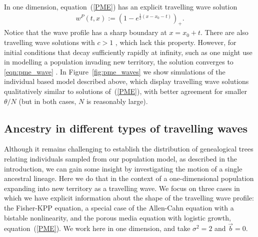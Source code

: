 \documentclass[EJP]{ejpecp} %
\newcommand{\meanq}{\vec b}    %
\newcommand{\comment}[1]{{\color{blue} \it #1}}
\newcommand{\citep}[1]{\cite{#1}}
\begin{document}
In one dimension, equation~(\ref{PME}) has an explicit travelling wave solution
\begin{align} \label{eqn:pme_wave}
    w^P(t, x)
    :=
    \left( 1 - e^{ \frac{1}{2} (x - x_0 - t) } \right)_+ .
\end{align}
Notice that the wave profile has a sharp boundary at $x = x_0 + t$.
There are also travelling wave solutions with $c>1$ \citep{gilding/kersner:2005},
which lack this property.
However, for initial conditions that decay sufficiently rapidly at infinity,
such as one might use in modelling a population invading new territory,
the solution converges to \eqref{eqn:pme_wave} \citep{kamin/rosenau:2004}.
In Figure~\ref{fig:pme_waves} we show simulations of the individual based model described above,
which display travelling wave solutions qualitatively similar to solutions of~(\ref{PME}),
with better agreement for smaller $\theta/N$
(but in both cases, $N$ is reasonably large).


\subsection{Ancestry in different types of travelling waves}
\label{ancestral lineages for travelling waves}


Although it remains challenging to establish the distribution of genealogical
trees relating individuals sampled from our population model, as described in
the introduction, we can gain some insight by investigating the motion of a
single ancestral lineage. Here we do that in the context of a one-dimensional
population expanding into new territory as a travelling wave. 
We focus on three cases in which we have 
explicit information about the shape of the travelling wave profile:
the Fisher-KPP equation,
a special case of the Allen-Cahn equation with a bistable nonlinearity,
and the porous media equation with logistic growth, equation~(\ref{PME}).
We work here in one dimension,
and take $\sigma^2 = 2$ and $\meanq = 0$.
\end{document}

